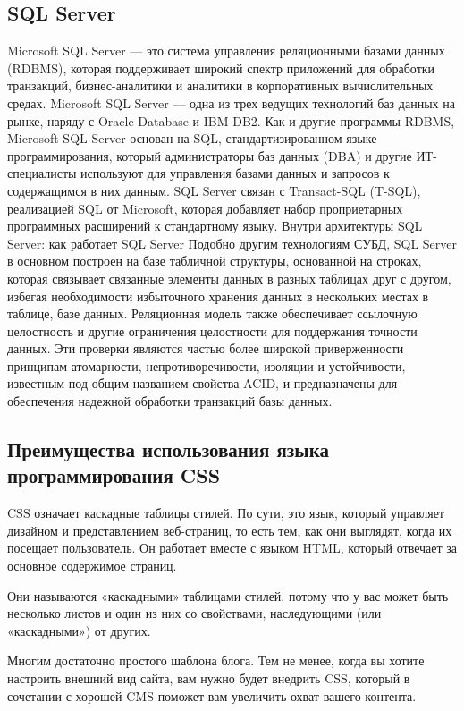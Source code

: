 \subsection{SQL Server}

Microsoft SQL Server — это система управления реляционными базами данных (RDBMS), которая поддерживает широкий спектр приложений для обработки транзакций, бизнес-аналитики и аналитики в корпоративных вычислительных средах. Microsoft SQL Server — одна из трех ведущих технологий баз данных на рынке, наряду с Oracle Database и IBM DB2.
Как и другие программы RDBMS, Microsoft SQL Server основан на SQL, стандартизированном языке программирования, который администраторы баз данных (DBA) и другие ИТ-специалисты используют для управления базами данных и запросов к содержащимся в них данным. SQL Server связан с Transact-SQL (T-SQL), реализацией SQL от Microsoft, которая добавляет набор проприетарных программных расширений к стандартному языку.
Внутри архитектуры SQL Server: как работает SQL Server Подобно другим технологиям СУБД, SQL Server в основном построен на базе табличной структуры, основанной на строках, которая связывает связанные элементы данных в разных таблицах друг с другом, избегая необходимости избыточного хранения данных в нескольких местах в таблице, базе данных. Реляционная модель также обеспечивает ссылочную целостность и другие ограничения целостности для поддержания точности данных. Эти проверки являются частью более широкой приверженности принципам атомарности, непротиворечивости, изоляции и устойчивости, известным под общим названием свойства ACID, и предназначены для
обеспечения надежной обработки транзакций базы данных.

\subsection{Преимущества использования языка программирования CSS}

CSS означает каскадные таблицы стилей. По сути, это язык, который управляет дизайном и представлением веб-страниц, то есть тем, как они выглядят, когда их посещает пользователь. Он работает вместе с языком HTML, который отвечает за основное содержимое страниц.

Они называются «каскадными» таблицами стилей, потому что у вас может быть несколько листов и один из них со свойствами, наследующими (или «каскадными») от других.

Многим достаточно простого шаблона блога. Тем не менее, когда вы хотите настроить внешний вид сайта, вам нужно будет внедрить CSS, который в сочетании с хорошей CMS поможет вам увеличить охват вашего контента.

